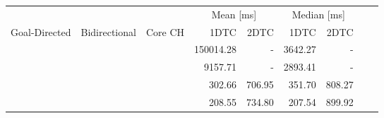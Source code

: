 \begin{tabular}{cccrrrrrr}
	\toprule
	              &               &         & \multicolumn{2}{c}{Mean [\si{\milli\second}]} & \multicolumn{2}{c}{Median [\si{\milli\second}]}               \\
	Goal-Directed & Bidirectional & Core CH & 1DTC                                          & 2DTC                                            & 1DTC & 2DTC \\
	\midrule
	\cmark        & \xmark        & \xmark  & 150014.28                                             & -                                               & 3642.27    & -    \\
	\cmark        & \cmark        & \xmark  & 9157.71                                             & -                                               & 2893.41    & -    \\
	\xmark        & \cmark        & \cmark  & 302.66                                             & 706.95                                               & 351.70    & 808.27    \\
	\cmark        & \cmark        & \cmark  & 208.55                                             & 734.80                                               & 207.54    & 899.92    \\
	\bottomrule
\end{tabular}